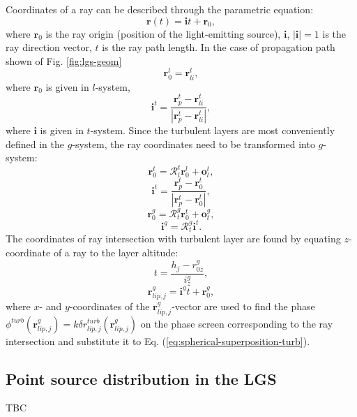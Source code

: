 Coordinates of a ray can be described through the parametric equation:
\begin{equation} \label{eq:ray-equation}
	\bm{r}(t) = \bm{i} t + \bm{r}_{0},
\end{equation}
where $\bm{r}_{0}$ is the ray origin (position of the light-emitting source),
$\bm{i}$, $|\bm{i}| = 1$ is the ray
direction vector, $t$ is the ray path length. In the case of propagation path
shown of Fig. \ref{fig:lgs-geom}
$$ \bm{r}^{l}_{0} = \bm{r}^{l}_{li}, $$
where $\bm{r}_{0}$ is given in $l$-system,
$$ \bm{i}^{t} = \frac{\bm{r}^{t}_{p} - \bm{r}^{t}_{li}}
                 {|\bm{r}^{t}_{p} - \bm{r}^{t}_{li}|}, $$
where $\bm{i}$ is given in $t$-system. Since the turbulent layers are most
conveniently defined in the $g$-system, the ray coordinates need to be
transformed into $g$-system:
\begin{equation} \label{eq:ray-transform}
	\bm{r}^{t}_{0} = \mathcal{R}_{l}^{t} \bm{r}^{l}_{0} + \bm{o}_{l}^{t},
\end{equation}
$$ \bm{i}^{t} = \frac{\bm{r}^{t}_{p} - \bm{r}^{t}_{0}}
                 {|\bm{r}^{t}_{p} - \bm{r}^{t}_{0}|}, $$
$$ \bm{r}^{g}_{0} = \mathcal{R}_{t}^{g} \bm{r}^{t}_{0} + \bm{o}_{t}^{g}, $$
$$ \bm{i}^{g} = \mathcal{R}_{t}^{g} \bm{i}^{t}. $$
The coordinates of ray intersection with turbulent layer are found by equating
$z$-coordinate of a ray to the layer altitude:
\begin{equation} \label{eq:layer-intersection}
	t = \frac{h_{j}-r^{g}_{0z}}{i^{g}_{z}},
\end{equation}
$$ \bm{r}^{g}_{lip,j} = \bm{i}^{g} t + \bm{r}_{0}^{g}, $$
where $x$- and $y$-coordinates of the $\bm{r}^{g}_{lip,j}$-vector are used to
find the phase $\phi^{turb}(\bm{r}^{g}_{lip,j}) = k \delta r^{turb}_{lip,j}
(\bm{r}^{g}_{lip,j})$ on the phase
screen corresponding to the ray intersection and substitute it to Eq.
(\ref{eq:spherical-superposition-turb}).


\subsection{Point source distribution in the LGS}
\label{sec:point-distribution}
TBC

